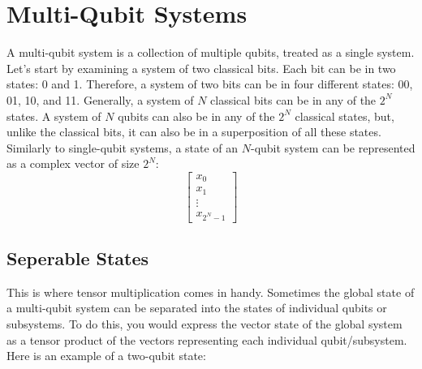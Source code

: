 \documentclass{article}
\begin{document}
\section{Multi-Qubit Systems}
 A multi-qubit system is a collection of multiple qubits, treated as a single system.
Let's start by examining a system of two classical bits. Each bit can be in two states: 0 and 1. Therefore, a system of two bits can be in four different states: 00, 01, 10, and 11. Generally, a system of $N$ classical bits can be in any of the $2^N$ states.
A system of $N$ qubits can also be in any of the $2^N$ classical states, but, unlike the classical bits, it can also be in a superposition of all these states.
Similarly to single-qubit systems, a state of an $N$-qubit system can be represented as a complex vector of size $2^N$:
\begin{equation*}
    \begin{bmatrix} x_0 \\ x_1 \\ \vdots \\ x_{2^N-1}\end{bmatrix}
\end{equation*}
\subsection{Seperable States}
This is where tensor multiplication comes in handy. Sometimes the global state of a multi-qubit system can be separated into the states of individual qubits or subsystems. To do this, you would express the vector state of the global system as a tensor product of the vectors representing each individual qubit/subsystem. Here is an example of a two-qubit state:
\end{document}
